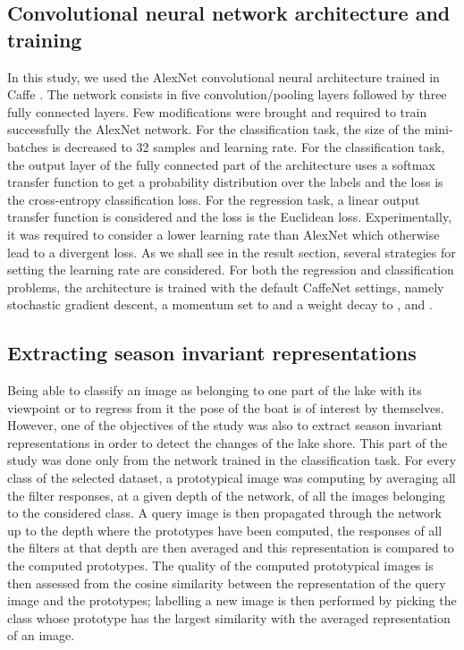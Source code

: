\subsection{Convolutional neural network architecture and training}

In this study, we used the AlexNet convolutional neural architecture \cite{NIPS2012_4824} trained in Caffe \cite{jia2014caffe}. The network consists in five convolution/pooling layers followed by three fully connected layers. Few modifications were brought and required to train successfully the AlexNet network. For the classification task, the size of the mini-batches is decreased to 32 samples and learning rate. For the classification task, the output layer of the fully connected part of the architecture uses a softmax transfer function to get a probability distribution over the labels and the loss is the cross-entropy classification loss. For the regression task, a linear output transfer function is considered and the loss is the Euclidean loss. Experimentally, it was required to consider a lower learning rate than AlexNet which otherwise lead to a divergent loss. As we shall see in the result section, several strategies for setting the learning rate are considered. For both the regression and classification problems, the architecture is trained with the default CaffeNet settings, namely stochastic gradient descent, a momentum set to  and a weight decay to , and .


\subsection{Extracting season invariant representations}

Being able to classify an image as belonging to one part of the lake with its viewpoint or to regress from it the pose of the boat is of interest by themselves. However, one of the objectives of the study was also to extract season invariant representations in order to detect the changes of the lake shore. This part of the study was done only from the network trained in the classification task. For every class of the selected dataset, a prototypical image was computing by averaging all the filter responses, at a given depth of the network, of all the images belonging to the considered class. A query image is then propagated through the network up to the depth where the prototypes have been computed, the responses of all the filters at that depth are then averaged and this representation is compared to the computed prototypes. The quality of the computed prototypical images is then assessed from the cosine similarity between the representation of the query image and the prototypes; labelling a new image is then performed by picking the class whose prototype has the largest similarity with the averaged representation of an image.
